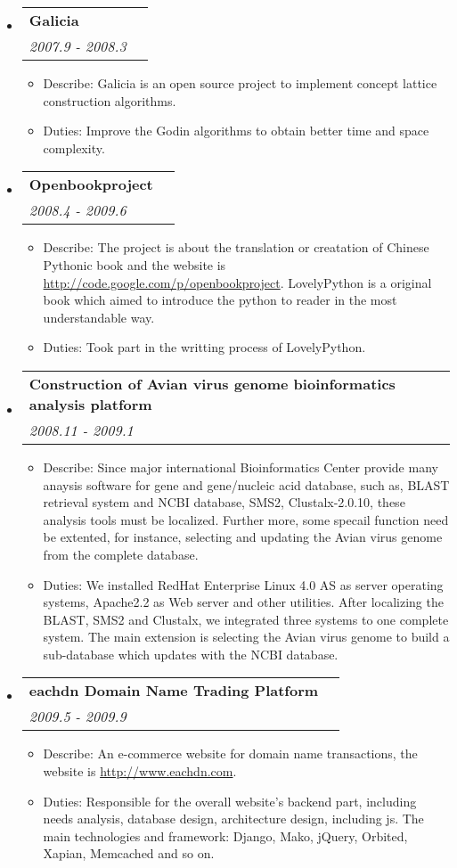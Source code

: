 \documentclass[letterpaper,11pt]{article}
\makeatletter
\newcommand{\resitem}[1]{\item #1 \vspace{-2pt}}
\newcommand{\resheading}[1]{{\large \parashade[.9]{sharpcorners}{\textbf{#1 \vphantom{p\^{E}}}}}}
\newcommand{\ressubheading}[4]{
\begin{tabular*}{6.5in}{l@{\extracolsep{\fill}}r}
        \textbf{#1} & #2 \\
        \textit{#3} & \textit{#4} \\
\end{tabular*}\vspace{-6pt}}
\makeatother
\begin{document}
\begin{CJK*}{GBK}{kai}
\resheading{Project Experience}
\begin{itemize}

\item
    \ressubheading{Galicia}{}{2007.9 - 2008.3}{}
    \begin{itemize}
        \resitem{   Describe: Galicia is an open source project to implement concept lattice construction algorithms.}
        \resitem{   Duties: Improve the Godin algorithms to obtain better time and space complexity.}
    \end{itemize}

\item
    \ressubheading{Openbookproject}{}{2008.4 - 2009.6}{}
    \begin{itemize}
        \resitem{   Describe: The project is about the translation or creatation of Chinese Pythonic book and the website is \href{http://code.google.com/p/openbookproject/}{http://code.google.com/p/openbookproject}. LovelyPython is a original book which aimed to introduce the python to reader in the most understandable way.}
        \resitem{   Duties: Took part in the writting process of LovelyPython.}
    \end{itemize}

\item
    \ressubheading{Construction of Avian virus genome bioinformatics analysis platform}{}{2008.11 - 2009.1}{}
    \begin{itemize}
        \resitem{   Describe: Since major international Bioinformatics Center provide many anaysis software for gene and gene/nucleic acid database, such as, BLAST retrieval system and NCBI database, SMS2, Clustalx-2.0.10, these analysis tools must be localized. Further more, some specail function need be extented, for instance, selecting and updating the Avian virus genome from the complete database.}
        \resitem{   Duties: We installed RedHat Enterprise Linux 4.0 AS as server operating systems, Apache2.2 as Web server and other utilities. After localizing the BLAST, SMS2 and Clustalx, we integrated three systems to one complete system. The main extension is selecting the Avian virus genome to build a sub-database which updates with the NCBI database.}
    \end{itemize}

\item
    \ressubheading{eachdn Domain Name Trading Platform}{}{2009.5 - 2009.9}{}
    \begin{itemize}
        \resitem{   Describe: An e-commerce website for domain name transactions, the website is \href{http://www.eachdn.com/}{http://www.eachdn.com}. }
        \resitem{   Duties: Responsible for the overall website's backend part, including needs analysis, database design, architecture design, including js. The main technologies and framework: Django, Mako, jQuery, Orbited, Xapian, Memcached and so on.}
    \end{itemize}


\end{itemize}
\end{CJK*}
\end{document}
